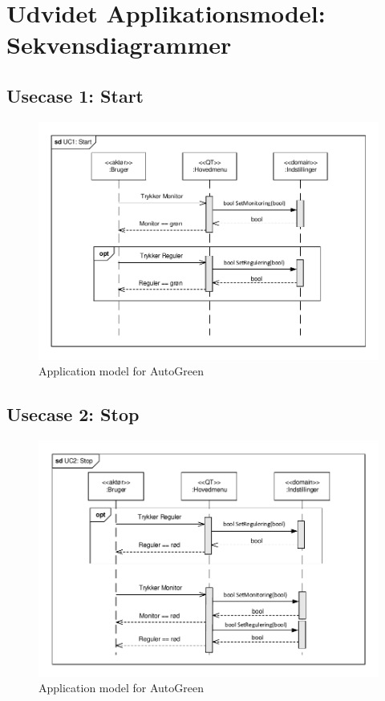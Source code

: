 \section{Udvidet Applikationsmodel: Sekvensdiagrammer}

\subsection{Usecase 1: Start}

\begin{figure}[!h]
\centering 
\includegraphics[width={\textwidth-1cm}, trim=0 0 0 0, clip=true] {../fig/SD_autoGreen_UC_1_Start.pdf}
\caption{Application model for AutoGreen}
\label{fig:SD_UC1}
\end{figure}

\clearpage

\subsection{Usecase 2: Stop}

\begin{figure}[!h]
\centering 
\includegraphics[width={\textwidth-1cm}, trim=0 0 0 0, clip=true] {../fig/SD_autoGreen_UC_2_Stop.pdf}
\caption{Application model for AutoGreen}
\label{fig:SD_UC2}
\end{figure}

